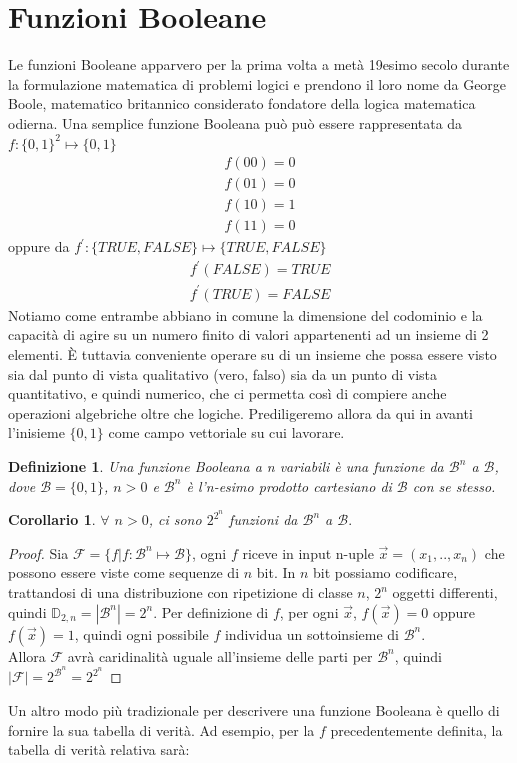 \documentclass[12pt,a4paper,openright]{report}
\newtheorem{mydef}{Definizione}[chapter]
\newtheorem*{mycor}{Corollario}
\begin{document}
\section{Funzioni Booleane}
Le funzioni Booleane apparvero per la prima volta a metà 19esimo secolo durante la formulazione matematica di problemi logici e prendono
il loro nome da George Boole, matematico britannico considerato fondatore della logica matematica odierna\cite{ref2}.\newpage
Una semplice funzione Booleana può può essere rappresentata da \\$f:\{0,1\}^2 \mapsto \{0,1\}$
\begin{align*}
    f(00) = 0 \\
    f(01) = 0 \\
    f(10) = 1 \\
    f(11) = 0
\end{align*}
oppure da $f^\prime:\{TRUE,FALSE\}\mapsto{\{TRUE,FALSE\}}$
\begin{align*}
    f^\prime(FALSE) = TRUE \\
    f^\prime(TRUE) = FALSE 
\end{align*}
Notiamo come entrambe abbiano in comune la dimensione del codominio e la capacità di agire su un numero finito di valori appartenenti ad un insieme di 2 elementi.
È tuttavia conveniente operare su di un insieme che possa essere visto sia dal punto di vista qualitativo (vero, falso)
sia da un punto di vista quantitativo, e quindi numerico, che ci permetta così di compiere anche operazioni algebriche oltre che logiche. Prediligeremo allora da qui in avanti l'inisieme
$\{0,1\}$ come campo vettoriale su cui lavorare.
\par
\begin{mydef}
    Una \textnormal{funzione Booleana a \textit{n} variabili} è una funzione da $\mathcal{B}^n$ a $\mathcal{B}$,
    dove $\mathcal{B} = \{0,1\}$, $n > 0$ e $\mathcal{B}^n$ è l'n-esimo prodotto cartesiano di $\mathcal{B}$ con se stesso.\cite{ref3}
\end{mydef}
\begin{mycor}
    $\forall$ $n > 0$, ci sono $2^{2^{n}}$ funzioni da $\mathcal{B}^n$ a $\mathcal{B}.$
\end{mycor}
\begin{proof}
    Sia $\mathcal{F}=\{f|f:\mathcal{B}^n\mapsto{\mathcal{B}}\}$,
    ogni $f$ riceve in input n-uple $\vec{x}=(x_1,..,x_n)$ che possono essere viste come sequenze di $n$ bit.
    In $n$ bit possiamo codificare, trattandosi di una distribuzione con ripetizione di classe $n$, $2^n$ oggetti differenti, quindi $\mathbb{D}_{2,n}=\left\vert{\mathcal{B}^n}\right\vert = 2^n$.
    Per definizione di $f$, per ogni $\vec{x}$, $f(\vec{x}) = 0$  oppure  $f(\vec{x}) = 1$, quindi ogni possibile $f$ individua un sottoinsieme di $\mathcal{B}^n$.\\
    Allora $\mathcal{F}$ avrà caridinalità uguale all'insieme delle parti per $\mathcal{B}^n$, quindi  $\left\vert{\mathcal{F}}\right\vert = 2^{\mathcal{B}^n}=2^{2^{n}}$

\end{proof}
Un altro modo più tradizionale per descrivere una funzione Booleana è quello di fornire la sua tabella di verità.
Ad esempio, per la $f$ precedentemente definita, la tabella di verità relativa sarà:
\end{document}
